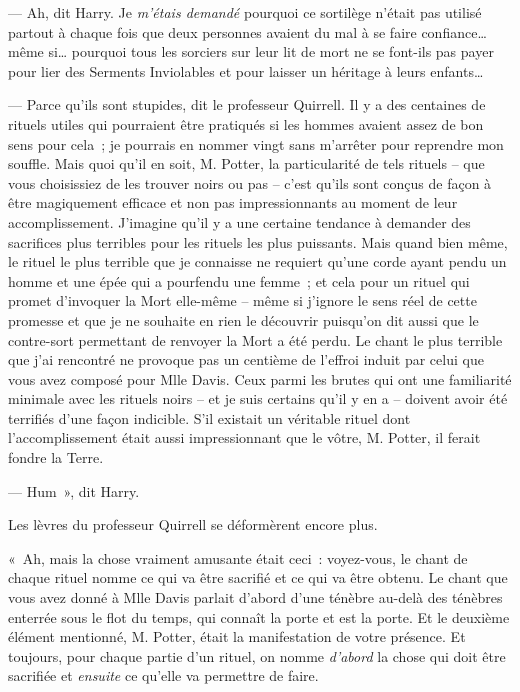 --- Ah, dit Harry. Je \emph{m'étais demandé} pourquoi ce sortilège n'était pas utilisé partout à chaque fois que deux personnes avaient du mal à se faire confiance… même si… pourquoi tous les sorciers sur leur lit de mort ne se font-ils pas payer pour lier des Serments Inviolables et pour laisser un héritage à leurs enfants…

--- Parce qu'ils sont stupides, dit le professeur Quirrell. Il y a des centaines de rituels utiles qui pourraient être pratiqués si les hommes avaient assez de bon sens pour cela~; je pourrais en nommer vingt sans m'arrêter pour reprendre mon souffle. Mais quoi qu'il en soit, M. Potter, la particularité de tels rituels -- que vous choisissiez de les trouver noirs ou pas -- c'est qu'ils sont conçus de façon à être magiquement efficace et non pas impressionnants au moment de leur accomplissement. J'imagine qu'il y a une certaine tendance à demander des sacrifices plus terribles pour les rituels les plus puissants. Mais quand bien même, le rituel le plus terrible que je connaisse ne requiert qu'une corde ayant pendu un homme et une épée qui a pourfendu une femme~; et cela pour un rituel qui promet d'invoquer la Mort elle-même -- même si j'ignore le sens réel de cette promesse et que je ne souhaite en rien le découvrir puisqu'on dit aussi que le contre-sort permettant de renvoyer la Mort a été perdu. Le chant le plus terrible que j'ai rencontré ne provoque pas un centième de l'effroi induit par celui que vous avez composé pour Mlle Davis. Ceux parmi les brutes qui ont une familiarité minimale avec les rituels noirs -- et je suis certains qu'il y en a -- doivent avoir été terrifiés d'une façon indicible. S'il existait un véritable rituel dont l'accomplissement était aussi impressionnant que le vôtre, M. Potter, il ferait fondre la Terre.

--- Hum~», dit Harry.

Les lèvres du professeur Quirrell se déformèrent encore plus.

«~Ah, mais la chose vraiment amusante était ceci~: voyez-vous, le chant de chaque rituel nomme ce qui va être sacrifié et ce qui va être obtenu. Le chant que vous avez donné à Mlle Davis parlait d'abord d'une ténèbre au-delà des ténèbres enterrée sous le flot du temps, qui connaît la porte et est la porte. Et le deuxième élément mentionné, M. Potter, était la manifestation de votre présence. Et toujours, pour chaque partie d'un rituel, on nomme \emph{d'abord} la chose qui doit être sacrifiée et \emph{ensuite} ce qu'elle va permettre de faire.

